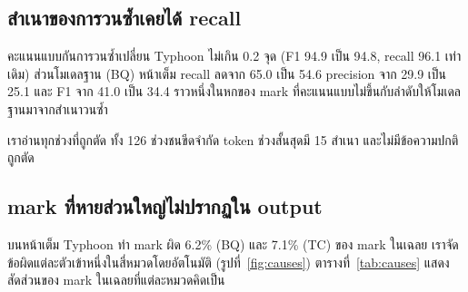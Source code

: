 \begin{table}[t]
\caption{Mark F1 อัตราผิดของวรรณยุกต์หลังอ่านพยัญชนะถูก และสัดส่วน output ที่ชนขีดจำกัด token (\%) Pathumma ใช้ prompt ของ model card}\label{tab:models}
\centering\footnotesize
{}
\end{table}

\subsection{สำเนาของการวนซ้ำเคยได้ recall}
คะแนนแบบกันการวนซ้ำเปลี่ยน Typhoon ไม่เกิน 0.2 จุด (F1 94.9 เป็น 94.8, recall 96.1 เท่าเดิม) ส่วนโมเดลฐาน (BQ) หน้าเต็ม recall ลดจาก 65.0 เป็น 54.6 precision จาก 29.9 เป็น 25.1 และ F1 จาก 41.0 เป็น 34.4 ราวหนึ่งในหกของ mark ที่คะแนนแบบไม่ขึ้นกับลำดับให้โมเดลฐานมาจากสำเนาวนซ้ำ

เราอ่านทุกช่วงที่ถูกตัด ทั้ง 126 ช่วงชนขีดจำกัด token ช่วงสั้นสุดมี 15 สำเนา และไม่มีข้อความปกติถูกตัด

\subsection{mark ที่หายส่วนใหญ่ไม่ปรากฏใน output}
บนหน้าเต็ม Typhoon ทำ mark ผิด 6.2\% (BQ) และ 7.1\% (TC) ของ mark ในเฉลย เราจัดข้อผิดแต่ละตัวเข้าหนึ่งในสี่หมวดโดยอัตโนมัติ (รูปที่~\ref{fig:causes}) ตารางที่~\ref{tab:causes} แสดงสัดส่วนของ mark ในเฉลยที่แต่ละหมวดคิดเป็น

